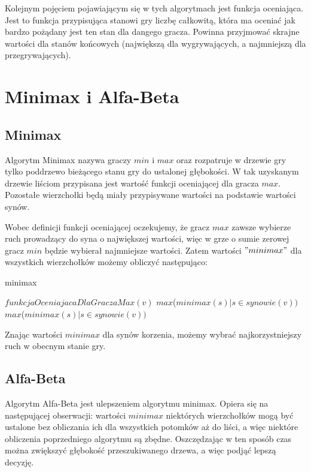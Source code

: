 \documentclass{pracamgr}
\begin{document}
Kolejnym pojęciem pojawiającym się w tych algorytmach jest funkcja oceniająca. Jest to funkcja przypisująca stanowi gry liczbę całkowitą, która ma oceniać jak bardzo pożądany jest ten stan dla dangego gracza. Powinna przyjmować skrajne wartości dla stanów końcowych (największą dla wygrywających, a najmniejszą dla przegrywających).

\section{Minimax i Alfa-Beta}

\subsection{Minimax}

Algorytm Minimax nazywa graczy \(min\) i \(max\) oraz rozpatruje w drzewie gry tylko poddrzewo bieżącego stanu gry do ustalonej głębokości. W tak uzyskanym drzewie liściom przypisana jest wartość funkcji oceniającej dla gracza \(max\). Pozostałe wierzchołki będą miały przypisywane wartości na podstawie wartości synów.

Wobec definicji funkcji oceniającej oczekujemy, że gracz \(max\) zawsze wybierze ruch prowadzący do syna o największej wartości, więc w grze o sumie zerowej gracz \(min\) będzie wybierał najmniejsze wartości. Zatem wartości \("minimax"\) dla wszystkich wierzchołków możemy obliczyć następująco:

\begin{algorithm}
\caption{minimax}\label{minimax}
\begin{algorithmic}[1]
	\State \Return $funkcjaOceniajacaDlaGraczaMax(v)$
\EndIf
{}
	\State \Return $max$($minimax(s) | s \in synowie(v))$
\Else
	\State \Return $max$($minimax(s) | s \in synowie(v))$
\EndIf
\EndFunction
\end{algorithmic}
\end{algorithm}

Znając wartości \(minimax\) dla synów korzenia, możemy wybrać najkorzystniejszy ruch w obecnym stanie gry.

\subsection{Alfa-Beta}

Algorytm Alfa-Beta jest ulepszeniem algorytmu minimax. Opiera się na następującej obserwacji: wartości \(minimax\) niektórych wierzchołków mogą być ustalone bez obliczania ich dla wszystkich potomków aż do liści, a więc niektóre obliczenia poprzedniego algorytmu są zbędne. Oszczędzając w ten sposób czas można zwiększyć głębokość przeszukiwanego drzewa, a więc podjąć lepszą decyzję.
\end{document}
